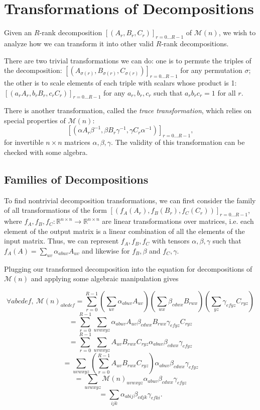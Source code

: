\documentclass{article}
\newcommand{\R}{\mathbb{R}}
\begin{document}
\section{Transformations of Decompositions}
Given an $R$-rank decomposition $[(A_r,B_r,C_r)]_{r=0\dots R-1}$ of $\mathcal{M}(n)$, we wish to analyze how we can transform it into other valid $R$-rank decompositions.

There are two trivial transformations we can do: one is to permute the triples of the decomposition: $[(A_{\sigma(r)},B_{\sigma(r)},C_{\sigma(r)})]_{r=0\dots R-1}$ for any permutation $\sigma$; the other is to scale elements of each triple with scalars whose product is 1: $[(a_rA_r,b_rB_r,c_rC_r)]_{r=0\dots R-1}$ for any $a_r,b_r,c_r$ such that $a_r b_r c_r=1$ for all $r$.

There is another transformation, called the \textit{trace transformation}, which relies on special properties of $\mathcal{M}(n)$: \[[(\alpha A_r\beta^{-1},\beta B_r\gamma^{-1},\gamma C_r\alpha^{-1})]_{r=0\dots R-1},\] for invertible $n\times n$ matrices $\alpha,\beta,\gamma$. The validity of this transformation can be checked with some algebra.

\subsection{Families of Decompositions}
To find nontrivial decomposition transformations, we can first consider the family of all transformations of the form $[(f_A(A_r),f_B(B_r),f_C(C_r))]_{r=0\dots R-1}$, where $f_A,f_B,f_C:\R^{n\times n}\rightarrow \R^{n\times n}$ are linear transformations over matrices, i.e. each element of the output matrix is a linear combination of all the elements of the input matrix. Thus, we can represent $f_A,f_B,f_C$ with tensors $\alpha,\beta,\gamma$ such that $f_A(A)=\sum_{uv}\alpha_{abuv}A_{uv}$ and likewise for $f_B,\beta$ and $f_C,\gamma$.

Plugging our transformed decomposition into the equation for decompositions of $\mathcal{M}(n)$ and applying some algebraic manipulation gives

\[\forall abcdef,\ \mathcal{M}(n)_{abcdef}=\sum_{r=0}^{R-1}(\sum_{uv}\alpha_{abuv}A_{uv})(\sum_{wx}\beta_{cdwx}B_{rwx})(\sum_{yz}\gamma_{efyz}C_{ryz})\]
\[=\sum_{r=0}^{R-1}\sum_{uvwxyz}\alpha_{abuv}A_{uv}\beta_{cdwx}B_{rwx}\gamma_{efyz}C_{ryz}\]
\[=\sum_{r=0}^{R-1}\sum_{uvwxyz}A_{uv}B_{rwx}C_{ryz}\alpha_{abuv}\beta_{cdwx}\gamma_{efyz}\]
\[=\sum_{uvwxyz}(\sum_{r=0}^{R-1}A_{uv}B_{rwx}C_{ryz})\alpha_{abuv}\beta_{cdwx}\gamma_{efyz}\]
\[=\sum_{uvwxyz}\mathcal{M}(n)_{uvwxyz}\alpha_{abuv}\beta_{cdwx}\gamma_{efyz}\]
\[=\sum_{ijk}\alpha_{abij}\beta_{cdjk}\gamma_{efki}.\]
\end{document}
